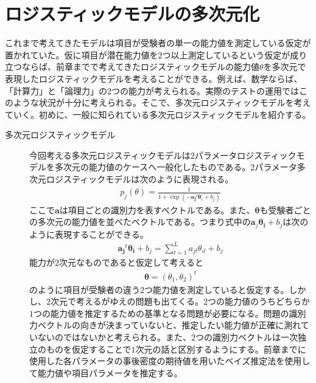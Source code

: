\documentclass[12pt]{jarticle}
\numberwithin{equation}{subsection}
\begin{document}
\section{ロジスティックモデルの多次元化}
\setcounter{subsection}{1}
これまで考えてきたモデルは項目が受験者の単一の能力値を測定している仮定が置かれていた。仮に項目が潜在能力値を$2$つ以上測定しているという仮定が成り立つならば、前章までで考えてきたロジスティックモデルの能力値$\theta$を多次元で表現したロジスティックモデルを考えることができる。例えば、数学ならば、「計算力」と「論理力」の$2$つの能力が考えられる。実際のテストの運用ではこのような状況が十分に考えられる。そこで、多次元ロジスティックモデルを考えていく。初めに、一般に知られている多次元ロジスティックモデルを紹介する。
\begin{description}
  \item[多次元ロジスティックモデル] 今回考える多次元ロジスティックモデルは$2$パラメータロジスティックモデルを多次元の能力値のケースへ一般化したものである。$2$パラメータ多次元ロジスティックモデルは次のように表現される。
  \begin{align}
    \displaystyle
    \label{4.1}
    p_j(\theta) = \frac{1}{1 + \exp(-\boldsymbol{{a}_j}^t \boldsymbol{\theta}_i + b_j)}
  \end{align}
  ここで$\boldsymbol{a}$は項目ごとの識別力を表すベクトルである。また、$\boldsymbol{\theta}$も受験者ごとの多次元の能力値を並べたベクトルである。つまり式中の$\boldsymbol{a}_j \boldsymbol{\theta_i} + b_j$は次のように表現することができる。
  \begin{align}
    \displaystyle
    \boldsymbol{{a}_j}^t \boldsymbol{\theta_i} + b_j = \sum_{l = 1}^{L} {a_{jl}}\theta_{il} + b_j
  \end{align}
  能力が$2$次元なものであると仮定して考えると
\begin{align}
  \displaystyle
  \boldsymbol{\theta} = (\theta_1,\theta_2)^t
\end{align}
のように項目が受験者の違う$2$つ能力値を測定していると仮定する。しかし、$2$次元で考えるがゆえの問題も出てくる。$2$つの能力値のうちどちらか$1$つの能力値を推定するための基準となる問題が必要になる。問題の識別力ベクトルの向きが決まっていないと、推定したい能力値が正確に測れていないのではないかと考えられる。また、$2$つの識別力ベクトルは一次独立のものを仮定することで$1$次元の話と区別するようにする。前章までに使用した各パラメータの事後密度の期待値を用いたベイズ推定法を使用して能力値や項目パラメータを推定する。
\end{description}
\end{document}

